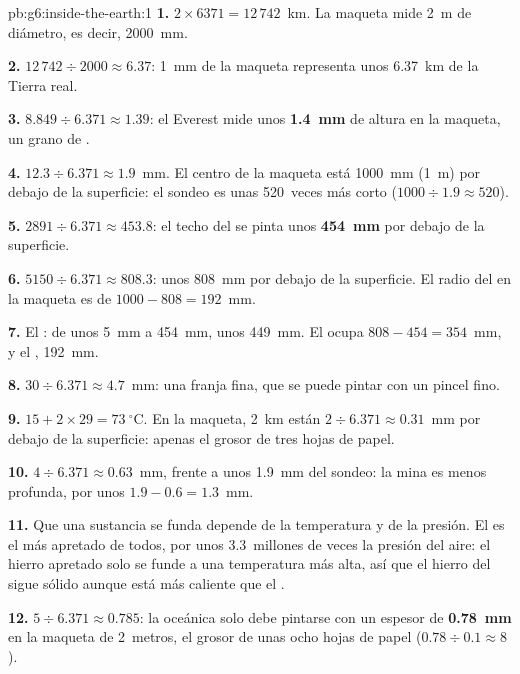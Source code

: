 \begin{solution}{pb:g6:inside-the-earth:1}
\textbf{1.} $2 \times 6371 = 12\,742$~km. La maqueta mide 2~m de diámetro,
es decir, 2000~mm.

\textbf{2.} $12\,742 \div 2000 \approx 6.37$: 1~mm de la maqueta
representa unos 6.37~km de la Tierra real.

\textbf{3.} $8.849 \div 6.371 \approx 1.39$: el Everest mide unos
\textbf{1.4~mm} de altura en la maqueta, un grano de .

\textbf{4.} $12.3 \div 6.371 \approx 1.9$~mm. El centro de la maqueta está
1000~mm (1~m) por debajo de la superficie: el sondeo es unas 520~veces más
corto ($1000 \div 1.9 \approx 520$).

\textbf{5.} $2891 \div 6.371 \approx 453.8$: el techo del  se
pinta unos \textbf{454~mm} por debajo de la superficie.

\textbf{6.} $5150 \div 6.371 \approx 808.3$: unos 808~mm por debajo de la
superficie. El radio del  en la maqueta es de
$1000 - 808 = 192$~mm.

\textbf{7.} El : de unos 5~mm a 454~mm, unos 449~mm. El 
ocupa $808 - 454 = 354$~mm, y el , 192~mm.

\textbf{8.} $30 \div 6.371 \approx 4.7$~mm: una franja fina, que se puede
pintar con un pincel fino.

\textbf{9.} $15 + 2 \times 29 = 73~^\circ$C. En la maqueta, 2~km están
$2 \div 6.371 \approx 0.31$~mm por debajo de la superficie: apenas el
grosor de tres hojas de papel.

\textbf{10.} $4 \div 6.371 \approx 0.63$~mm, frente a unos 1.9~mm del
sondeo: la mina es menos profunda, por unos $1.9 - 0.6 = 1.3$~mm.

\textbf{11.} Que una sustancia se funda depende de la temperatura y de la
presión. El  es el más apretado de todos, por unos
3.3~millones de veces la presión del aire: el hierro apretado solo se funde
a una temperatura más alta, así que el hierro del  sigue
sólido aunque está más caliente que el .

\textbf{12.} $5 \div 6.371 \approx 0.785$: la  oceánica solo debe
pintarse con un espesor de \textbf{0.78~mm} en la maqueta de 2~metros, el
grosor de unas ocho hojas de papel ($0.78 \div 0.1 \approx 8$).
\end{solution}
